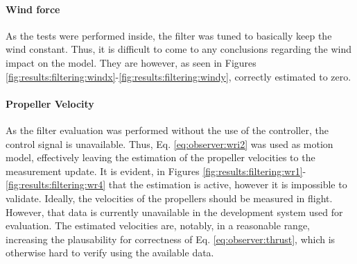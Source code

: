 

\paragraph{Wind force}
    As the tests were performed inside, the filter was tuned to basically keep the
    wind constant. Thus, it is difficult to come to any conclusions regarding the
    wind impact on the model. They are however, as seen in Figures \ref{fig:results:filtering:windx}-\ref{fig:results:filtering:windy},
    correctly estimated to zero.

\paragraph{Propeller Velocity}
    As the filter evaluation was performed without the use of the controller,
    the control signal is unavailable. Thus, Eq. \ref{eq:observer:wri2} was used as
    motion model, effectively leaving the estimation of the propeller velocities
    to the measurement update. It is evident, in Figures \ref{fig:results:filtering:wr1}-\ref{fig:results:filtering:wr4}
    that the estimation is active, however it is impossible to validate.
    Ideally, the velocities of the propellers should be measured in flight.
    However, that data is currently unavailable in the development system used for evaluation.
    The estimated velocities are, notably, in a reasonable range,
    increasing the plausability for correctness of Eq. \ref{eq:observer:thrust}, which is
    otherwise hard to verify using the available data.
